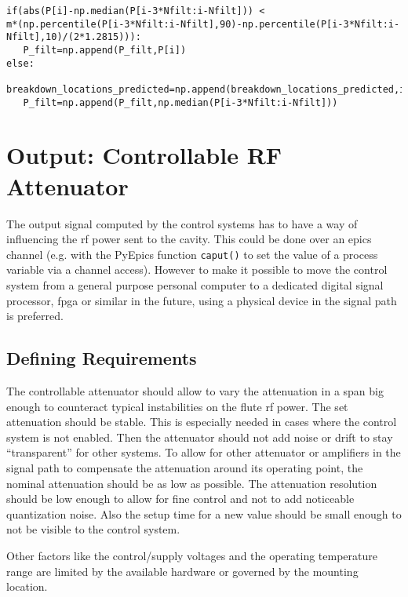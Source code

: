\begin{lstlisting}[style=python,caption = Breakdown removal filtering, label = lst:control-system-breakdownremoval]
if(abs(P[i]-np.median(P[i-3*Nfilt:i-Nfilt])) <
m*(np.percentile(P[i-3*Nfilt:i-Nfilt],90)-np.percentile(P[i-3*Nfilt:i-Nfilt],10)/(2*1.2815))):
   P_filt=np.append(P_filt,P[i])
else:
   breakdown_locations_predicted=np.append(breakdown_locations_predicted,i)
   P_filt=np.append(P_filt,np.median(P[i-3*Nfilt:i-Nfilt]))
\end{lstlisting}




\newpage
\section{Output: Controllable RF Attenuator}\label{sec:atteneval}
The output signal computed by the control systems has to have a way of influencing the \gls{rf} power sent to the cavity. This could be done over an \gls{epics} channel (e.g. with the PyEpics function \texttt{caput()} to set the value of a process variable via a channel access). However to make it possible to move the control system from a general purpose personal computer to a dedicated digital signal processor, \gls{fpga} or similar in the future, using a physical device in the signal path is preferred.\\

\subsection{Defining Requirements}
The controllable attenuator should allow to vary the attenuation in a span big enough to counteract typical instabilities on the \gls{flute} \gls{rf} power. The set attenuation should be stable. This is especially needed in cases where the control system is not enabled. Then the attenuator should not add noise or drift to stay ``transparent'' for other systems. To allow for other attenuator or amplifiers in the signal path to compensate the attenuation around its operating point, the nominal attenuation should be as low as possible. The attenuation resolution should be low enough to allow for fine control and not to add noticeable quantization noise. Also the setup time for a new value should be small enough to not be visible to the control system.

Other factors like the control/supply voltages and the operating temperature range are limited by the available hardware or governed by the mounting location.

